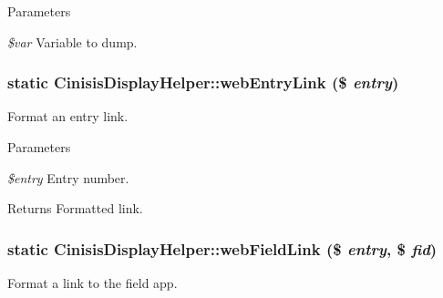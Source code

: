 \begin{DoxyParams}{Parameters}
\item[{\em \$var}]Variable to dump. \end{DoxyParams}
\hypertarget{classCinisisDisplayHelper_a7ffe33c336d0b495807a2c4bae78cbfb}{
\subsubsection[{webEntryLink}]{\setlength{\rightskip}{0pt plus 5cm}static CinisisDisplayHelper::webEntryLink (\$ {\em entry})}}
\label{classCinisisDisplayHelper_a7ffe33c336d0b495807a2c4bae78cbfb}
Format an entry link.


\begin{DoxyParams}{Parameters}
\item[{\em \$entry}]Entry number.\end{DoxyParams}
\begin{DoxyReturn}{Returns}
Formatted link. 
\end{DoxyReturn}
\hypertarget{classCinisisDisplayHelper_a5c3500893f3f7e415fe87874c808021d}{
\subsubsection[{webFieldLink}]{\setlength{\rightskip}{0pt plus 5cm}static CinisisDisplayHelper::webFieldLink (\$ {\em entry}, \/  \$ {\em fid})}}
\label{classCinisisDisplayHelper_a5c3500893f3f7e415fe87874c808021d}
Format a link to the field app.


